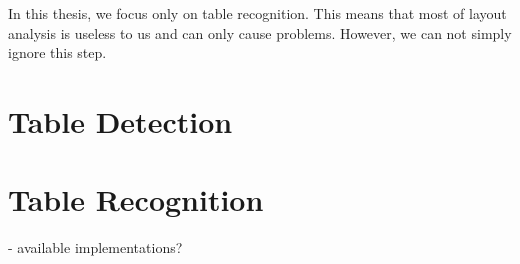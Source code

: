 In this thesis, we focus only on table recognition. This means that most of layout analysis is useless to us and can only cause problems. However, we can not simply ignore this step. 

\section{Table Detection}


\section{Table Recognition}

- available implementations? 






